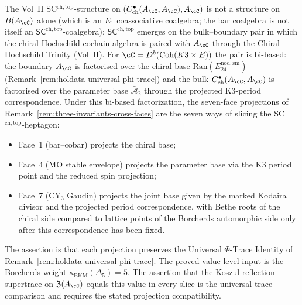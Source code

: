 \begin{remark}
\label{rem:holdata-bibased-sc-chtop}
The Vol~II SC$^{\mathrm{ch,top}}$-structure on
$(C^\bullet_{\mathrm{ch}}(A_\cC, A_\cC), A_\cC)$ is not a structure on
$\bar B(A_\cC)$ alone (which is an $E_1$ coassociative coalgebra; the
bar coalgebra is not itself an $\mathsf{SC}^{\mathrm{ch,top}}$-coalgebra);
$\mathsf{SC}^{\mathrm{ch,top}}$ emerges on the bulk--boundary pair in
which the chiral Hochschild cochain algebra is paired with $A_\cC$
through the Chiral Hochschild Trinity (Vol~II). For
$\cC = D^b(\mathrm{Coh}(K3 \times E))$ the pair is bi-based: the
boundary $A_\cC$ is factorised over the chiral base
$\mathrm{Ran}(E_{24}^{\mathrm{nod,sm}})$
(Remark~\ref{rem:holdata-universal-phi-trace}) and the bulk
$C^\bullet_{\mathrm{ch}}(A_\cC, A_\cC)$ is factorised over the parameter
base $\bar{\mathcal{A}}_2$ through the projected K3-period
correspondence. Under this bi-based factorization, the seven-face projections
of Remark~\ref{rem:three-invariants-cross-faces} are the seven ways of
slicing the SC$^{\mathrm{ch,top}}$-heptagon:
\begin{itemize}
\item Face~1 (bar--cobar) projects the chiral base;
\item Face~4 (MO stable envelope) projects the parameter base via the
K3 period point and the reduced spin projection;
\item Face~7 (CY$_3$ Gaudin) projects the joint base
given by the marked Kodaira divisor and the projected period
correspondence, with Bethe roots of the chiral side compared to lattice
points of the Borcherds automorphic side only after this correspondence
has been fixed.
\end{itemize}
The assertion is that each projection preserves the Universal
$\Phi$-Trace Identity of Remark~\ref{rem:holdata-universal-phi-trace}.
The proved value-level input is the Borcherds weight
\(\kappa_{\mathrm{BKM}}(\Delta_5)=5\). The assertion that the Koszul
reflection supertrace on \(\mathfrak{Z}(A_\cC)\) equals this value in
every slice is the universal-trace comparison and requires the stated
projection compatibility.
\end{remark}


